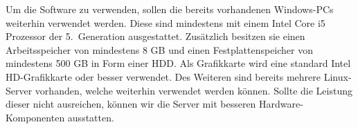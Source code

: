 Um die Software zu verwenden, sollen die bereits vorhandenen Windows-PCs weiterhin verwendet werden.
Diese sind mindestens mit einem Intel Core i5 Prozessor der 5.\ Generation ausgestattet.
Zusätzlich besitzen sie einen Arbeitsspeicher von mindestens 8 GB und einen Festplattenspeicher von mindestens 500 GB
in Form einer HDD\@.
Als Grafikkarte wird eine standard Intel HD-Grafikkarte oder besser verwendet.
Des Weiteren sind bereits mehrere Linux-Server vorhanden, welche weiterhin verwendet werden können.
Sollte die Leistung dieser nicht ausreichen,
können wir die Server mit besseren Hardware-Komponenten ausstatten.